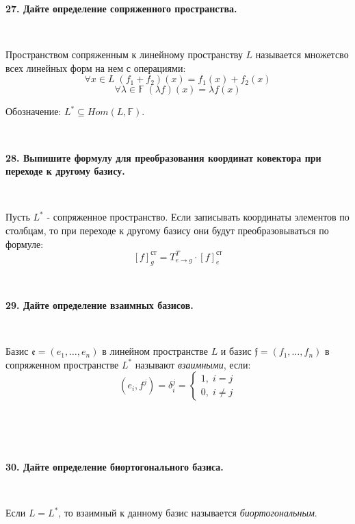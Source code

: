 \documentclass{article}
\begin{document}
	\textbf{27. Дайте определение сопряженного пространства.}
	
	{
		$\;$
		\setlength{\parindent}{0.4cm}
		\hangindent=0.4cm
		
		Пространством сопряженным к линейному пространству $L$ называется множетсво всех линейных форм на нем с операциями:
		$$
		\forall x \in L \; (f_1 + f_2)(x) = f_1(x) + f_2(x)
		$$
		$$
	 	\forall \lambda \in \mathbb{F} \; (\lambda f)(x) = \lambda f(x)
		$$
		
		Обозначение: $L^* \subseteq Hom(L, \mathbb{F})$.
		
		$\;$
		\setlength{\parindent}{0cm}
		\hangindent=0cm
	}

	\textbf{28. Выпишите формулу для преобразования координат ковектора при переходе к другому базису.}
	
	{
		$\;$
		\setlength{\parindent}{0.4cm}
		\hangindent=0.4cm
		
		Пусть $L^*$ - сопряженное пространство. Если записывать координаты элементов по столбцам, то при переходе к другому базису они будут преобразовываться по формуле:
		$$
		[f]_g^{\text{ст}} = T_{e \rightarrow g}^T \cdot [f]_e^{\text{ст}}
		$$
		
		$\;$
		\setlength{\parindent}{0cm}
		\hangindent=0cm
	}

	\textbf{29. Дайте определение взаимных базисов.}
	
	{
		$\;$
		\setlength{\parindent}{0.4cm}
		\hangindent=0.4cm
		
		Базис $\mathfrak{e}=(e_1,\dots,e_n)$ в линейном пространстве $L$ и базис $\mathfrak{f} = (f_1, \dots,f_n)$ в сопряженном пространстве $L^*$ называют \textit{взаимными}, если:
		$$
		(e_i, f^j) = \delta_i^j=\begin{cases}
		1, \; i = j \\
		0, \; i \not = j
		\end{cases}
		$$
		
		$\;$
		\setlength{\parindent}{0cm}
		\hangindent=0cm
	}
	\textbf{}\\
	\textbf{}\\

	\textbf{30. Дайте определение биортогонального базиса.}
	
	{
		$\;$
		\setlength{\parindent}{0.4cm}
		\hangindent=0.4cm
		
		Если $L = L^*$, то взаимный к данному базис называется \textit{биортогональным}.
		
		$\;$
		\setlength{\parindent}{0cm}
		\hangindent=0cm
	}
\end{document}
